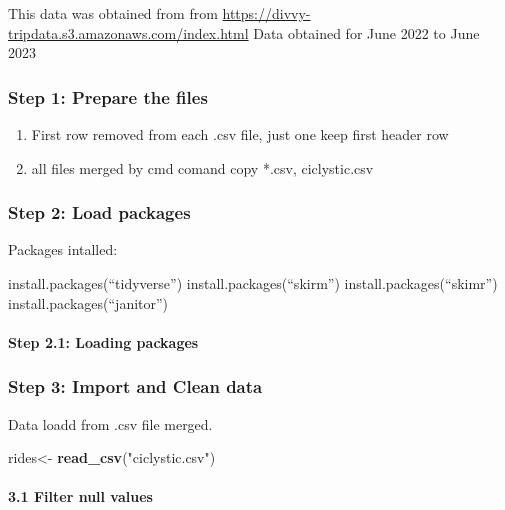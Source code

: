 \documentclass[
]{article}
\newenvironment{Shaded}{\begin{snugshade}}{\end{snugshade}}
\newcommand{\FunctionTok}[1]{\textcolor[rgb]{0.13,0.29,0.53}{\textbf{#1}}}
\newcommand{\NormalTok}[1]{#1}
\newcommand{\OtherTok}[1]{\textcolor[rgb]{0.56,0.35,0.01}{#1}}
\newcommand{\StringTok}[1]{\textcolor[rgb]{0.31,0.60,0.02}{#1}}
\providecommand{\tightlist}{%
  \setlength{\itemsep}{0pt}\setlength{\parskip}{0pt}}
\begin{document}
This data was obtained from from
\url{https://divvy-tripdata.s3.amazonaws.com/index.html} Data obtained
for June 2022 to June 2023

\hypertarget{step-1-prepare-the-files}{%
\subsubsection{Step 1: Prepare the
files}\label{step-1-prepare-the-files}}

\begin{enumerate}
\def\labelenumi{\arabic{enumi}.}
\tightlist
\item
  First row removed from each .csv file, just one keep first header row
\item
  all files merged by cmd comand copy *.csv, ciclystic.csv
\end{enumerate}

\hypertarget{step-2-load-packages}{%
\subsubsection{Step 2: Load packages}\label{step-2-load-packages}}

Packages intalled:

install.packages(``tidyverse'') install.packages(``skirm'')
install.packages(``skimr'') install.packages(``janitor'')

\hypertarget{step-2.1-loading-packages}{%
\paragraph{Step 2.1: Loading packages}\label{step-2.1-loading-packages}}

\hypertarget{step-3-import-and-clean-data}{%
\subsubsection{Step 3: Import and Clean
data}\label{step-3-import-and-clean-data}}

Data loadd from .csv file merged.

\begin{Shaded}
\begin{Highlighting}[]
\NormalTok{rides}\OtherTok{\textless{}{-}} \FunctionTok{read\_csv}\NormalTok{(}\StringTok{"ciclystic.csv"}\NormalTok{)}
\end{Highlighting}
\end{Shaded}

\hypertarget{filter-null-values}{%
\paragraph{3.1 Filter null values}\label{filter-null-values}}
\end{document}
